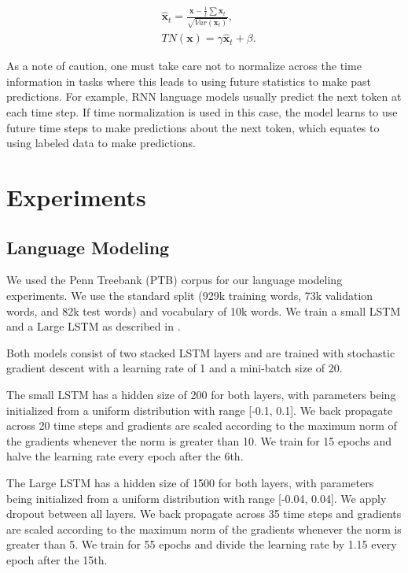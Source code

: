 \documentclass{article}
\def\x{{\mathbf x}}
\begin{document}
\begin{equation}
	\begin{split}
		& \hat \x_t = \frac{\mathbf x - \frac{1}{t} \sum \x_t}{\sqrt{Var(\x_t)}}, \\
		& TN(\x) = \gamma \hat \x_t + \beta.
	\end{split}
\end{equation}

As a note of caution, one must take care not to normalize across the time information in tasks where this leads to using future statistics to make past predictions. For example, RNN language models usually predict the next token at each time step. If time normalization is used in this case, the model learns to use future time steps to make predictions about the next token, which equates to using labeled data to make predictions.

\section{Experiments}

\subsection{Language Modeling}
We used the Penn Treebank (PTB) \citep{marcus1993building} corpus for our language modeling experiments. We use the standard split (929k training words, 73k validation words, and 82k test words) and vocabulary of 10k words. We train a small LSTM and a Large LSTM as described in \citep{zaremba2014recurrent}.

Both models consist of two stacked LSTM layers and are trained with stochastic gradient descent with a learning rate of 1 and a mini-batch size of 20.

The small LSTM has a hidden size of 200 for both layers, with parameters being initialized from a uniform distribution with range  [-0.1, 0.1]. We back propagate across 20 time steps and gradients are scaled according to the maximum norm of the gradients whenever the norm is greater than 10. We train for 15 epochs and halve the learning rate every epoch after the 6th.  

The Large LSTM has a hidden size of 1500 for both layers, with parameters being initialized from a uniform distribution with range [-0.04, 0.04]. We apply dropout between all layers. We back propagate across 35 time steps and gradients are scaled according to the maximum norm of the gradients whenever the norm is greater than 5. We train for 55 epochs and divide the learning rate by 1.15 every epoch after the 15th.
\end{document}
